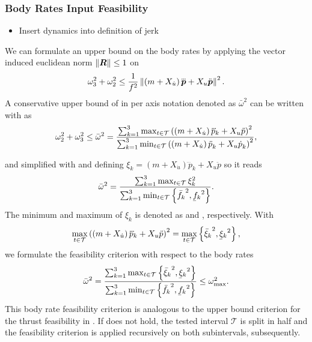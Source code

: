 \subsubsection{Body Rates Input Feasibility}
\begin{itemize}
	\color{red}
	\item Insert dynamics into definition of jerk
\end{itemize}
We can formulate an upper bound on the body rates by applying the vector induced euclidean norm $\left\lVert\mbox{$\bm{R}$}\right\rVert \leq 1$ on 
\begin{equation}
	\label{eq:body-rates-bound}
	\omega_3^2 + \omega_2^2 \leq
	\frac{1}{f^2}
	\left\lVert
		\left(
			m + X_{\dot{u}}
		\right) \mbox{$\dddot{\bm{p}}$} + X_u \mbox{$\ddot{\bm{p}}$}
	\right\rVert^2
	.
\end{equation}
A conservative upper bound of  in per axis notation denoted as $\bar{\omega}^2$ can be written with  as
\begin{equation}
	\omega_2^2 + \omega_3^2
	\leq
	\bar{\omega}^2
	=
	\frac{
		\sum_{k=1}^{3}
		\max_{t \in \mathcal{T}}
		\left(
			\left(
				m + X_{\dot{u}}
			\right)\dddot{p}_k + X_u \ddot{p}
		\right)^2
	}{
		\sum_{k=1}^{3}
		\min_{t \in \mathcal{T}}
		\left(
			\left(m + X_{\dot{u}}\right)\mbox{$\ddot{p}$}_k
			+ X_u \mbox{$\dot{p}$}_k
		\right)^2
	}
	,
\end{equation}

and simplified with  and defining $\xi_k = \left(m + X_{\dot{u}}\right)\dddot{p}_k + X_u \ddot{p}$ so it reads
\begin{equation}
	\bar{\omega}^2 =
	\frac{
		\sum_{k=1}^{3}
		\max_{t \in \mathcal{T}}
		\xi_k^2
	}{
		\sum_{k=1}^{3}
		\min_{t \in \mathcal{T}}
		\left\{\fmaxaxis^2, \fminaxis^2\right\}
	}
	.
\end{equation}
The minimum and maximum of $\xi_k$ is denoted as \ximaxaxis and \ximinaxis, respectively. With
\begin{equation}
	\max_{t \in \mathcal{T}}
	\left(
		\left(
			m + X_{\dot{u}}
		\right)
		\dddot{p}_k + X_u \ddot{p}
	\right)^2 =
	\max_{t \in \mathcal{T}}
	\left\{
		\ximaxaxis^2, \ximinaxis^2
	\right\}
	,
\end{equation}
we formulate the feasibility criterion with respect to the body rates
\begin{equation}
	\label{eq:body-rates-criterion-per-axis}
	\bar{\omega}^2
	=
	\frac{
		\sum_{k=1}^{3}
		\max_{t \in \mathcal{T}}
		\left\{
			\ximaxaxis^2, \ximinaxis^2
		\right\}
	}{
		\sum_{k=1}^{3}
		\min_{t \in \mathcal{T}}
		\left\{\fmaxaxis^2, \fminaxis^2\right\}
	}
	\leq
	\omegamaxsquare
	.
\end{equation}
This body rate feasibility criterion is analogous to the upper bound criterion for the thrust feasibility in . If  does not hold, the tested interval $\mathcal{T}$ is split in half and the feasibility criterion is applied recursively on both subintervals, subsequently.


